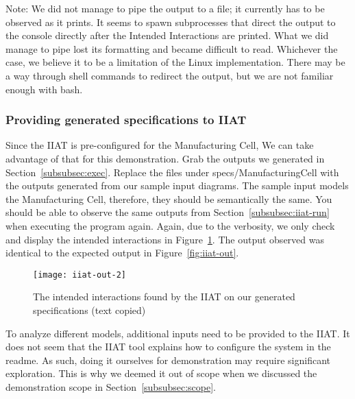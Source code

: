 Note: We did not manage to pipe the output to a file; it currently has to be observed as it prints.
It seems to spawn subprocesses that direct the output to the console directly after the Intended Interactions are printed.
What we did manage to pipe lost its formatting and became difficult to read.
Whichever the case, we believe it to be a limitation of the Linux implementation.
There may be a way through shell commands to redirect the output, but we are not familiar enough with bash.

\subsubsection{Providing generated specifications to IIAT}
Since the IIAT is pre-configured for the Manufacturing Cell,
We can take advantage of that for this demonstration.
Grab the outputs we generated in Section~\ref{subsubsec:exec}.
Replace the files under specs/ManufacturingCell with the outputs generated from our sample input diagrams.
The sample input models the Manufacturing Cell, therefore, they should be semantically the same.
You should be able to observe the same outputs from Section~\ref{subsubsec:iiat-run} when executing the program again.
Again, due to the verbosity, we only check and display the intended interactions in Figure~\ref{fig:iiat-out2}.
The output observed was identical to the expected output in Figure~\ref{fig:iiat-out}.
\begin{figure}[ht]
    \centering
    \texttt{[image: iiat-out-2]}
    \caption{The intended interactions found by the IIAT on our generated specifications (text copied)}
    \label{fig:iiat-out2}
\end{figure}
To analyze different models, additional inputs need to be provided to the IIAT\@.
It does not seem that the IIAT tool explains how to configure the system in the readme.
As such, doing it ourselves for demonstration may require significant exploration.
This is why we deemed it out of scope when we discussed the demonstration scope in Section~\ref{subsubsec:scope}.